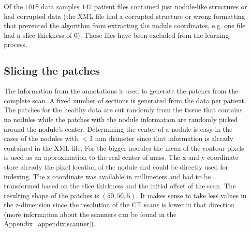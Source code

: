 \documentclass[../Thesis.tex]{subfiles}
\begin{document}
Of the $1018$ data samples $147$ patient files contained just nodule-like structures or had corrupted data (the XML file had a corrupted structure or wrong formatting that prevented the algorithm from extracting the nodule coordinates, e.g. one file had a slice thickness of $0$). Those files have been excluded from the learning process.

\subsection{Slicing the patches}
The information from the annotations is used to generate the patches from the complete scan. A fixed number of sections is generated from the data per patient. The patches for the healthy data are cut randomly from the tissue that contains no nodules while the patches with the nodule information are randomly picked around the nodule's center. Determining the center of a nodule is easy in the cases of the nodules with $<3$ mm diameter since that information is already contained in the XML file. For the bigger nodules the mean of the contour pixels is used as an approximation to the real center of mass. The x and y coordinate store already the pixel location of the nodule and could be directly used for indexing. The z coordinate was available in millimeters and had to be transformed based on the slice thickness and the initial offset of the scan. The resulting shape of the patches is $(50,50,5)$. It makes sense to take less values in the z-dimension since the resolution of the CT scans is lower in that direction (more information about the scanners can be found in the Appendix~\ref{appendix:scanner}).
\end{document}
